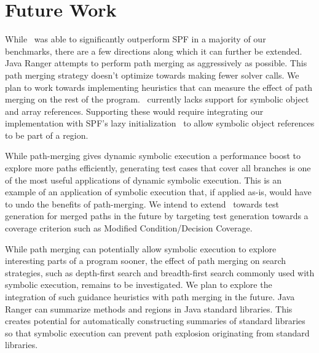 \section{Future Work}
\label{sec:futureWork}
While \tool\ was able to significantly outperform SPF in a majority of our benchmarks, there are a few directions
along which it can further be extended.
%
Java Ranger attempts to perform path merging as aggressively as possible.
%
This path merging strategy doesn't optimize towards making fewer solver calls.
%
We plan to work towards implementing heuristics that can measure the effect of path merging on the rest of the program.
%
\tool\ currently lacks support for symbolic object and array references.
%
Supporting these would require integrating our implementation with
SPF\rq s lazy initialization~\cite{spf} to allow symbolic object references to be part of a region.

While path-merging gives dynamic symbolic execution a performance boost to explore more paths
efficiently, generating test cases that cover all branches is one of the most useful applications of dynamic
symbolic execution.
%
This is an example of an application of symbolic execution that, if applied as-is, would have to undo the benefits of
path-merging.
%
We intend to extend \tool\ towards test generation for merged paths in the future by targeting test generation
towards a coverage criterion such as Modified Condition/Decision Coverage.

While path merging can potentially allow symbolic execution to explore interesting parts of a program sooner, the
effect of path merging on search strategies, such as depth-first search and breadth-first search commonly used with
symbolic execution, remains to be investigated.
%
We plan to explore the integration of such guidance heuristics with path merging in the future.
%
Java Ranger can summarize methods and regions in Java standard libraries.
%
This creates potential for automatically constructing summaries of standard libraries so that symbolic execution
can prevent path explosion originating from standard libraries.